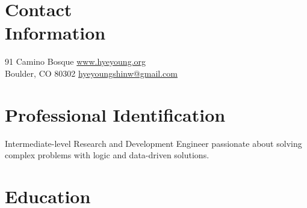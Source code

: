 \documentclass[margin,line]{resume}
\begin{document}
\newcommand{\Hawaii}{Hawai\kern.05em`\kern.05em\relax i}
\newcommand{\Manoa}{M\=anoa}

\begin{resume}

    \section{\mysidestyle Contact\\Information}
     91 Camino Bosque              \hfill    \href{https://www.hyeyoung.org}{www.hyeyoung.org}\\
     Boulder, CO 80302             \hfill    \href{mailto:hyeyoungshinw@gmail.com}{hyeyoungshinw@gmail.com}

    \section{\mysidestyle Professional Identification}
    Intermediate-level Research and Development Engineer passionate about solving complex problems with logic and data-driven solutions.
    

    
    
    \section{\mysidestyle Education}


\end{resume}
\end{document}
